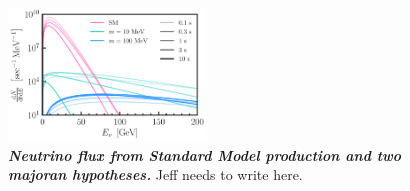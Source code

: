 \begin{figure}[t!]
    \centering
    \includegraphics[width=0.47\textwidth]{figures/majoran_fluxes.pdf}
    \caption{\textbf{\textit{Neutrino flux from Standard Model production and two majoran hypotheses.}}
    Jeff needs to write here.
    }
    \label{fig:fluxes}
\end{figure}